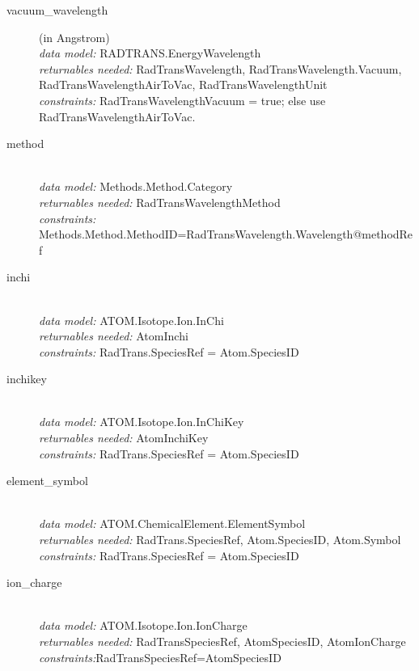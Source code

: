 \documentclass[11pt,a4paper]{ivoa}
\begin{document}
\renewcommand{\descriptionlabel}[1]{\hspace{\labelsep}\texttt{#1}}
\begin{description}

\item [vacuum\_wavelength] (in Angstrom)\hfill\\
    \textit{data model:} RADTRANS.EnergyWavelength\\
	\textit{returnables needed:} RadTransWavelength, RadTransWavelength.Vacuum, RadTransWavelengthAirToVac, RadTransWavelengthUnit\\
	\textit{constraints:} RadTransWavelengthVacuum = true; else use RadTransWavelengthAirToVac.\\
	
\item [method] \hfill\\
	\textit{data model:} Methods.Method.Category\\
	\textit{returnables needed:} RadTransWavelengthMethod\\
	\textit{constraints:} Methods.Method.MethodID=RadTransWavelength.Wavelength@methodRef\\

\item [inchi] \hfill\\
	\textit{data model:} ATOM.Isotope.Ion.InChi\\
        \textit{returnables needed:} AtomInchi\\
	\textit{constraints:} RadTrans.SpeciesRef = Atom.SpeciesID
	
\item [inchikey] \hfill\\
	\textit{data model:} ATOM.Isotope.Ion.InChiKey\\
         \textit{returnables needed:} AtomInchiKey\\
         \textit{constraints:} RadTrans.SpeciesRef = Atom.SpeciesID

\item [element\_symbol] \hfill\\
	\textit{data model:} ATOM.ChemicalElement.ElementSymbol\\
	\textit{returnables needed:} RadTrans.SpeciesRef, Atom.SpeciesID, Atom.Symbol
	\textit{constraints:}  RadTrans.SpeciesRef = Atom.SpeciesID

\item [ion\_charge]\hfill\\
	\textit{data model:} ATOM.Isotope.Ion.IonCharge\\
	\textit{returnables needed:} RadTransSpeciesRef, AtomSpeciesID, AtomIonCharge\\
	\textit{constraints:}RadTransSpeciesRef=AtomSpeciesID


\end{description}
\end{document}

